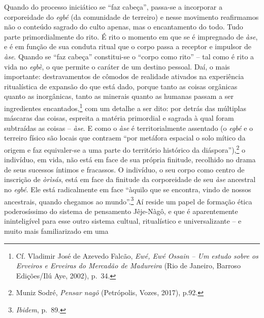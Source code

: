 Quando do processo iniciático se ``faz cabeça'', passa-se a incorporar a
corporeidade do \emph{egbé} (da comunidade de terreiro) e nesse
movimento reafirmamos não o conteúdo sagrado do culto apenas, mas o
encantamento do todo. Tudo parte primordialmente do rito. É rito o
momento em que se é impregnado de \emph{àse}, e é em função de sua
conduta ritual que o corpo passa a receptor e impulsor de \emph{àse}.
Quando se ``faz cabeça'' constitui-se o ``corpo como rito'' -- tal como
é rito a vida no \emph{egbè}, o que permite o caráter de um destino
pessoal. Daí, o mais importante: destravamentos de cômodos de realidade
ativados na experiência ritualística de expansão do que está dado,
porque tanto as coisas orgânicas quanto as inorgânicas, tanto as
minerais quanto as humanas passam a ser ingredientes
encantados,\footnote{Cf. Vladimir José de Azevedo Falcão, \emph{Ewé, Ewé
  Ossain -- Um estudo sobre os Erveiros e Erveiras do Mercadão de
  Madureira} (Rio de Janeiro, Barroso Edições/Ilú Aye, 2002), p.~34.}
com um detalhe a ser dito: por detrás das múltiplas máscaras das coisas,
espreita a matéria primordial e sagrada à qual foram subtraídas as
coisas -- \emph{àse}. E como o \emph{àse} é territorialmente assentado
(o \emph{egbé} e o terreiro físico são locais que contraem ``por
metáfora espacial o solo mítico da origem e faz equivaler-se a uma parte
do território histórico da diáspora''),\footnote{Muniz Sodré,
  \emph{Pensar nagô} (Petrópolis, Vozes, 2017), p.92.} o indivíduo, em
vida, não está em face de sua própria finitude, recolhido no drama de
seus sucessos íntimos e fracassos. O indivíduo, o seu corpo como centro
de inscrição de \emph{òrìsás}, está em face da finitude da corporeidade
de seu \emph{àse} ancestral no \emph{egbé}. Ele está radicalmente em
face ``àquilo que se encontra, vindo de nossos ancestrais, quando
chegamos ao mundo''.\footnote{\emph{Ibidem}, p.~89.} Aí reside um papel
de formação ética poderosíssimo do sistema de pensamento Jêje-Nàgô, e
que é aparentemente ininteligível para esse outro sistema cultual,
ritualístico e universalizante -- e muito mais familiarizado em uma
